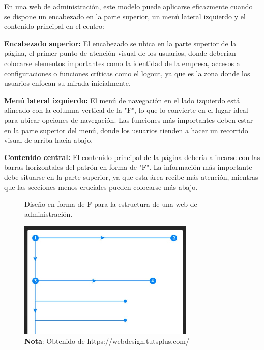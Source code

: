 		En una web de administración, este modelo puede aplicarse eficazmente cuando se dispone un encabezado en la parte superior, un menú lateral izquierdo y el contenido principal en el centro:
		
		\textbf{Encabezado superior:} El encabezado se ubica en la parte superior de la página, el primer punto de atención visual de los usuarios, donde deberían colocarse elementos importantes como la identidad de la empresa, accesos a configuraciones o funciones críticas como el logout, ya que es la zona donde los usuarios enfocan su mirada inicialmente.
		
		\textbf{Menú lateral izquierdo:} El menú de navegación en el lado izquierdo está alineado con la columna vertical de la "F", lo que lo convierte en el lugar ideal para ubicar opciones de navegación. Las funciones más importantes deben estar en la parte superior del menú, donde los usuarios tienden a hacer un recorrido visual de arriba hacia abajo.
		
		\textbf{Contenido central:} El contenido principal de la página debería alinearse con las barras horizontales del patrón en forma de "F". La información más importante debe situarse en la parte superior, ya que esta área recibe más atención, mientras que las secciones menos cruciales pueden colocarse más abajo.
		
		\begin{figure}[h] %
			\caption[Diseño en forma de F]
			{\newline Diseño en forma de F para la estructura de una web de administración.} %
			\vspace{0.3cm}
			\centering
			\includegraphics[width=0.75\textwidth]{imagenes/figura2_5.jpg} %
			\vspace{0.3cm}
			\caption*{\textup{\textbf{Nota}: Obtenido de https://webdesign.tutsplus.com/}}
			\vspace{-0.8cm}
			\label{fig:figura2_5} %
		\end{figure}
		
